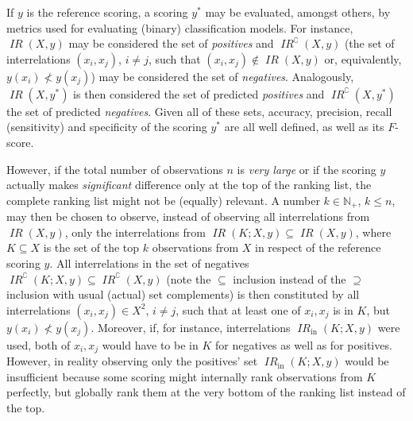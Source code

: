 \documentclass[conference, a4paper, 12pt]{IEEEtran}
\newcommand*{\positives}[1]{{#1}_{{+}}}
\newcommand*{\naturals}{\mathbb{N}}
\DeclareMathOperator{\interrel}{\mathit{IR}}
\begin{document}
    \par

    If $ y $ is the reference scoring, a scoring $ y^{{*}} $ may be evaluated, amongst others, by metrics used for evaluating (binary) classification models. For instance, $ \interrel \left( X , y \right) $ may be considered the set of \emph{positives} and $ \interrel^{\complement} \left( X , y \right) $ (the set of interrelations $ \left( x_{i} , x_{j} \right) $, $ i \neq j $, such that $ \left( x_{i} , x_{j} \right) \notin \interrel \left( X , y \right) $ or, equivalently, $ y \left( x_{i} \right) \nless y \left( x_{j} \right) $) may be considered the set of \emph{negatives}. Analogously, $ \interrel \left( X , y^{{*}} \right) $ is then considered the set of predicted \emph{positives} and $ \interrel^{\complement} \left( X , y^{{*}} \right) $ the set of predicted \emph{negatives}. Given all of these sets, accuracy, precision, recall (sensitivity) and specificity of the scoring $ y^{{*}} $ are all well defined, as well as its $ F $-score.

    \par

    However, if the total number of observations $ n $ is \emph{very large} or if the scoring $ y $ actually makes \emph{significant} difference only at the top of the ranking list, the complete ranking list might not be (equally) relevant. A number $ k \in \positives{\naturals} $, $ k \leq n $, may then be chosen to observe, instead of observing all interrelations from $ \interrel \left( X , y \right) $, only the interrelations from $ \interrel \left( K ; X , y \right) \subseteq \interrel \left( X , y \right) $, where $ K \subseteq X $ is the set of the top $ k $ observations from $ X $ in respect of the reference scoring $ y $. All interrelations in the set of negatives $ \interrel^{\complement} \left( K ; X , y \right) \subseteq \interrel^{\complement} \left( X , y \right) $ (note the $ {\subseteq} $ inclusion instead of the $ {\supseteq} $ inclusion with usual (actual) set complements) is then constituted by all interrelations $ \left( x_{i} , x_{j} \right) \in X^{2} $, $ i \neq j $, such that at least one of $ x_{i} , x_{j} $ is in $ K $, but $ y \left( x_{i} \right) \nless y \left( x_{j} \right) $. Moreover, if, for instance, interrelations $ \interrel_{\text{in}} \left( K ; X , y \right) $ were used, both of $ x_{i} , x_{j} $ would have to be in $ K $ for negatives as well as for positives. However, in reality observing only the positives' set $ \interrel_{\text{in}} \left( K ; X , y \right) $ would be insufficient because some scoring might internally rank observations from $ K $ perfectly, but globally rank them at the very bottom of the ranking list instead of the top.
\end{document}
